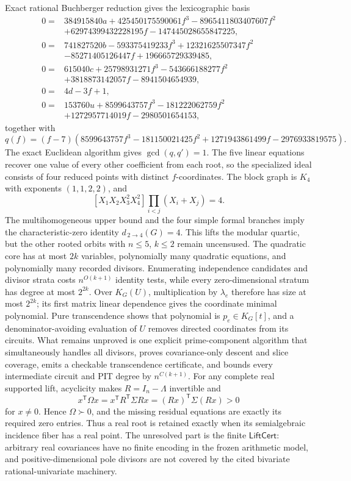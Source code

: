 Exact rational Buchberger reduction gives the lexicographic basis
\[
\begin{aligned}
0={}&384915840a+425450175590061f^3-8965411803407607f^2\\
&+62974399432228195f-147445028655847225,\\
0={}&741827520b-593375419233f^3+12321625507347f^2\\
&-85271405126447f+196665729339485,\\
0={}&615040c+25798931271f^3-543666188277f^2\\
&+3818873142057f-8941504654939,\\
0={}&4d-3f+1,\\
0={}&153760u+8599643757f^3-181222062759f^2\\
&+1272957714019f-2980501654153,
\end{aligned}
\]
together with
\[
q(f)=(f-7)(8599643757f^3-181150021425f^2
+1271943861499f-2976933819575).
\]
The exact Euclidean algorithm gives \(\gcd(q,q')=1\). The five linear equations recover one value of every other coefficient from each root, so the specialized ideal consists of four reduced points with distinct \(f\)-coordinates. The block graph is \(K_4\) with exponents \((1,1,2,2)\), and
\[
[X_1X_2X_3^2X_4^2]\prod_{i<j}(X_i+X_j)=4.
\]
The multihomogeneous upper bound and the four simple formal branches imply the characteristic-zero identity \(d_{\,2\to4}(G)=4\). This lifts the modular quartic, but the other rooted orbits with \(n\le5\), \(k\le2\) remain uncensused.
The quadratic core has at most \(2k\) variables, polynomially many quadratic equations, and polynomially many recorded divisors. Enumerating independence candidates and divisor strata costs \(n^{O(k+1)}\) identity tests, while every zero-dimensional stratum has degree at most \(2^{2k}\). Over \(K_G(U)\), multiplication by \(\lambda_e\) therefore has size at most \(2^{2k}\); its first matrix linear dependence gives the coordinate minimal polynomial. Pure transcendence shows that polynomial is \(p_e\in K_G[t]\), and a denominator-avoiding evaluation of \(U\) removes directed coordinates from its circuits. What remains unproved is one explicit prime-component algorithm that simultaneously handles all divisors, proves covariance-only descent and slice coverage, emits a checkable transcendence certificate, and bounds every intermediate circuit and PIT degree by \(n^{C(k+1)}\).
For any complete real supported lift, acyclicity makes \(R=I_n-\Lambda\) invertible and
\[
x^{\mathsf T}\Omega x=x^{\mathsf T}R^{\mathsf T}\Sigma Rx=(Rx)^{\mathsf T}\Sigma(Rx)>0
\]
for \(x\ne0\). Hence \(\Omega\succ0\), and the missing residual equations are exactly its required zero entries. Thus a real root is retained exactly when its semialgebraic incidence fiber has a real point. The unresolved part is the finite \(\mathsf{LiftCert}\): arbitrary real covariances have no finite encoding in the frozen arithmetic model, and positive-dimensional pole divisors are not covered by the cited bivariate rational-univariate machinery.

